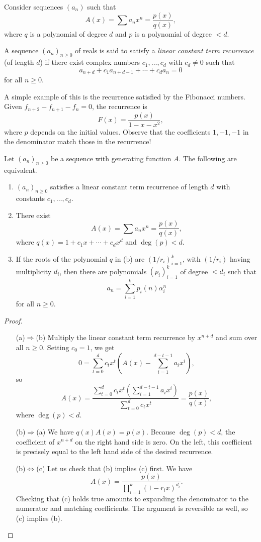 	Consider sequences $(a_n)$ such that
	\[ A(x) = \sum a_n x^n = \frac{p(x)}{q(x)}, \]
	where $q$ is a polynomial of degree $d$ and $p$ is a polynomial of degree $<d$.	
	\begin{fdef}
		A sequence $(a_n)_{n \ge 0}$ of reals is said to satisfy a \emph{linear constant term recurrence} (of length $d$) if there exist complex numbers $c_1,\ldots,c_d$ with $c_d \ne 0$ such that
		\[ a_{n+d} + c_1 a_{n+d-1} + \cdots + c_d a_n = 0 \]
		for all $n \ge 0$.
	\end{fdef}

	A simple example of this is the recurrence satisfied by the Fibonacci numbers. Given $f_{n+2} - f_{n+1} - f_n = 0$, the recurrence is
	\[ F(x) = \frac{p(x)}{1-x-x^2}, \]
	where $p$ depends on the initial values. Observe that the coefficients $1,-1,-1$ in the denominator match those in the recurrence!

	\begin{ftheo}
		\label{theo: linear const term recurrence}
		Let $(a_n)_{n\ge 0}$ be a sequence with generating function $A$. The following are equivalent.
		\begin{enumerate}[label=(\alph*)]
			\item $(a_n)_{n \ge 0}$ satisfies a linear constant term recurrence of length $d$ with constants $c_1,\ldots,c_d$.
			\item There exist 
			\[ A(x) = \sum a_n x^n = \frac{p(x)}{q(x)}, \]
			where $q(x) = 1 + c_1x + \cdots + c_dx^d$ and $\deg(p) < d$.
			\item If the roots of the polynomial $q$ in (b) are $(1/r_i)_{i=1}^k$, with $(1/r_i)$ having multiplicity $d_i$, then there are polynomials $(p_i)_{i=1}^k$ of degree $<d_i$ such that
			\[ a_n = \sum_{i=1}^k p_i(n) \alpha_i^n \]
			for all $n \ge 0$.
		\end{enumerate}
	\end{ftheo}
	\begin{proof}
		\phantom{pain}
		\begin{itemize}
			\item[(a)$\Rightarrow $(b)] Multiply the linear constant term recurrence by $x^{n+d}$ and sum over all $n \ge 0$. Setting $c_0 = 1$, we get
			\[ 0 = \sum_{t=0}^{d} c_t x^t \left( A(x) - \sum_{i=1}^{d-t-1} a_i x^i \right), \]
			so
			\[ A(x) = \frac{\sum_{t=0}^d c_t x^t \left( \sum_{i=1}^{d-t-1} a_i x^i \right) }{\sum_{t=0}^d c_t x^t} = \frac{p(x)}{q(x)}, \]
			where $\deg(p) < d$.

			\item[(b)$\Rightarrow$(a)] We have $q(x) A(x) = p(x)$. Because $\deg(p) < d$, the coefficient of $x^{n+d}$ on the right hand side is zero. On the left, this coefficient is precisely equal to the left hand side of the desired recurrence.

			\item[(b)$\Leftrightarrow$(c)] Let us check that (b) implies (c) first. We have
			\[ A(x) = \frac{p(x)}{\prod_{i=1}^k (1-r_ix)^{d_i}}. \]
			Checking that (c) holds true amounts to expanding the denominator to the numerator and matching coefficients. The argument is reversible as well, so (c) implies (b).
		\end{itemize}
	\end{proof}

